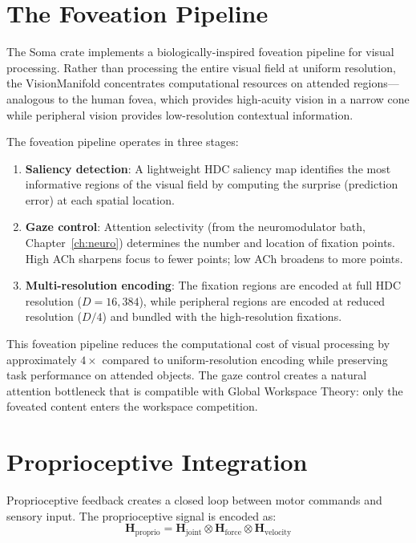 \documentclass[12pt]{book}
\newcommand{\bind}{\otimes}
\begin{document}
\section{The Foveation Pipeline}

The Soma crate implements a biologically-inspired foveation pipeline for visual processing. Rather than processing the entire visual field at uniform resolution, the VisionManifold concentrates computational resources on attended regions---analogous to the human fovea, which provides high-acuity vision in a narrow cone while peripheral vision provides low-resolution contextual information.

The foveation pipeline operates in three stages:

\begin{enumerate}
  \item \textbf{Saliency detection}: A lightweight HDC saliency map identifies the most informative regions of the visual field by computing the surprise (prediction error) at each spatial location.
  \item \textbf{Gaze control}: Attention selectivity (from the neuromodulator bath, Chapter~\ref{ch:neuro}) determines the number and location of fixation points. High ACh sharpens focus to fewer points; low ACh broadens to more points.
  \item \textbf{Multi-resolution encoding}: The fixation regions are encoded at full HDC resolution ($D = 16{,}384$), while peripheral regions are encoded at reduced resolution ($D/4$) and bundled with the high-resolution fixations.
\end{enumerate}

This foveation pipeline reduces the computational cost of visual processing by approximately $4\times$ compared to uniform-resolution encoding while preserving task performance on attended objects. The gaze control creates a natural attention bottleneck that is compatible with Global Workspace Theory: only the foveated content enters the workspace competition.

\section{Proprioceptive Integration}

Proprioceptive feedback creates a closed loop between motor commands and sensory input. The proprioceptive signal is encoded as:
\begin{equation}
\mathbf{H}_{\text{proprio}} = \mathbf{H}_{\text{joint}} \bind \mathbf{H}_{\text{force}} \bind \mathbf{H}_{\text{velocity}}
\end{equation}
\end{document}
